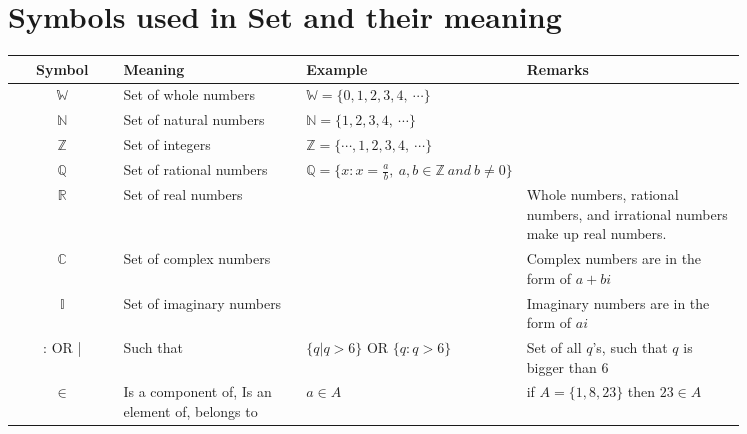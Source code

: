 \documentclass[./main.tex]{subfiles}
\begin{document}
\section*{Symbols used in Set and their meaning}
    \begin{center}
        \begin{longtable}[h]{|c|p{0.25\linewidth}|p{0.3\linewidth}|p{0.3\linewidth}|}
            \hline
            \rowcolor{cyan!30}
            Symbol 			& Meaning 					& Example 										& Remarks \\ \hline \endhead

            $\mathbb{W}$ 	& Set of whole numbers		& $\mathbb{W}=
                                                            \{0,1,2,3,4,\ \cdots \}$ 					& \\ \hline

            $\mathbb{N}$ 	& Set of natural numbers	& $\mathbb{N}= \{1,2,3,4,\ \cdots \}$ 			& \\ \hline

            $\mathbb{Z}$ 	& Set of integers			& $\mathbb{Z}= \{\cdots , 1,2,3,4,\ \cdots \}$ 	& \\ \hline

            $\mathbb{Q}$ 	& Set of rational numbers	& $\mathbb{Q}= \{x:x = \frac{a}{b},\ a,b
                                                                 \in \mathbb{Z}\ and \ b \ne 0\}$ 		& \\ \hline

            $\mathbb{R}$ 	& Set of real numbers		& 												& Whole numbers, rational numbers,
                                                                                                          and irrational numbers make up real numbers. \\ \hline

            $\mathbb{C}$ 	& Set of complex numbers	& 												& Complex numbers are in the form of $a+bi$ \\ \hline

            $\mathbb{I}$ 	& Set of imaginary numbers	& 												& Imaginary numbers are in the form of $ai$ \\ \hline

            : OR |		 	& Such that					& $\{q | q > 6 \}$ OR $\{q : q > 6 \}$			& Set of all $q$'s, such that $q$ is bigger than 6 \\ \hline

            $\in$		 	& Is a component of, Is an
                                 element of, belongs to & $a \in A$										& if $A = \{1,8,23 \} $ then $23 \in A$\\ \hline


\end{longtable}
\end{center}
\end{document}
